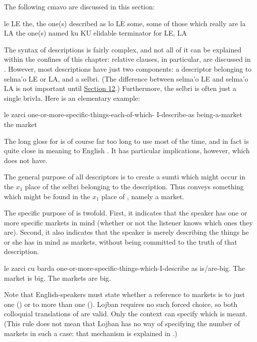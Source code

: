 The following cmavo are discussed in this section:

   le  LE  the, the one(s) described as
    lo  LE  some, some of those which really are
    la  LA  the one(s) named
    ku  KU  elidable terminator for LE, LA

The syntax of descriptions is fairly complex, and not all of it
    can be explained within the confines of this chapter: relative
    clauses, in particular, are discussed in . However, most descriptions
    have just two components: a descriptor belonging to selma'o LE
    or LA, and a selbri. (The difference between selma'o LE and
    selma'o LA is not important until \hyperref[sec:6:12]{Section
    12}.) Furthermore, the selbri is often just a single brivla.
    Here is an elementary example:
\begin{example}
le zarci\n
one-or-more-specific-things-each-of-which-\n
\T	I-describe-as being-a-market\n
the market
\end{example}

The long gloss for  is of course far too long to use most
    of the time, and in fact  is quite close in meaning to
    English . It has particular implications, however, which
     does not have. 

The general purpose of all descriptors is to create a sumti
    which might occur in the $x_1$ place of the selbri belonging to
    the description. Thus  conveys something which
    might be found in the $x_1$ place of , namely a
    market.

The specific purpose of  is twofold. First, it
    indicates that the speaker has one or more specific markets in
    mind (whether or not the listener knows which ones they are).
    Second, it also indicates that the speaker is merely describing
    the things he or she has in mind as markets, without being
    committed to the truth of that description.
\begin{example}
le zarci\n
\T	cu barda\n
one-or-more-specific-things-which-I-describe as \n
\T	is/are-big.\n
The market is big.\n
The markets are big.
\end{example}

Note that English-speakers must state whether a reference to
    markets is to just one () or to more than one
    (). Lojban requires no such forced choice, so
    both colloquial translations of 
    are valid. Only the context can specify which is meant. (This
    rule does not mean that Lojban has no way of specifying the
    number of markets in such a case: that mechanism is explained
    in .) 

